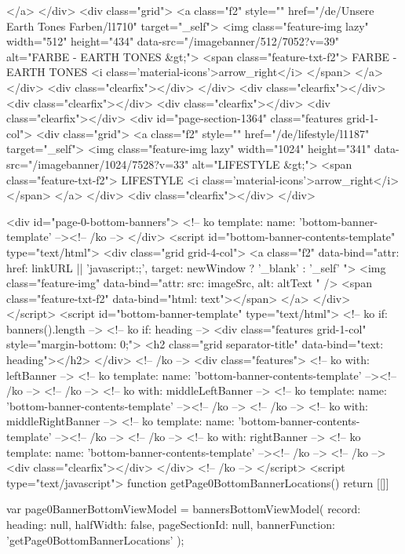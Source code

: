 {{</a>
</div>
<div class="grid">
<a class="f2" style="" href="/de/Unsere Earth Tones Farben/l1710" target="_self">
<img class="feature-img lazy" width="512" height="434" data-src="/imagebanner/512/7052?v=39" alt="FARBE - EARTH TONES &gt;">
<span class="feature-txt-f2">
FARBE - EARTH TONES <i class='material-icons'>arrow_right</i>
</span>
</a>
</div>
<div class="clearfix"></div>
</div>
<div class="clearfix"></div>
<div class="clearfix"></div>
<div class="clearfix"></div>
<div class="clearfix"></div>
<div id="page-section-1364" class="features grid-1-col">
<div class="grid">
<a class="f2" style="" href="/de/lifestyle/l1187" target="_self">
<img class="feature-img lazy" width="1024" height="341" data-src="/imagebanner/1024/7528?v=33" alt="LIFESTYLE &gt;">
<span class="feature-txt-f2">
LIFESTYLE <i class='material-icons'>arrow_right</i>
</span>
</a>
</div>
<div class="clearfix"></div>
</div>


<div id="page-0-bottom-banners">
<!-- ko template: { name: 'bottom-banner-template' } --><!-- /ko -->
</div>
<script id="bottom-banner-contents-template" type="text/html">
    <div class="grid grid-4-col">
        <a class="f2" data-bind="attr: { href: linkURL || 'javascript:;', target: newWindow ? '_blank' : '_self' }">
            <img class="feature-img" data-bind="attr: { src: imageSrc, alt: altText }" />
            <span class="feature-txt-f2" data-bind="html: text"></span>
        </a>
    </div>
</script>
<script id="bottom-banner-template" type="text/html">
    <!-- ko if: banners().length -->
    <!-- ko if: heading -->
    <div class="features grid-1-col" style="margin-bottom: 0;">
        <h2 class="grid separator-title" data-bind="text: heading"></h2>
    </div>
    <!-- /ko -->
    <div class="features">
        <!-- ko with: leftBanner -->
        <!-- ko template: { name: 'bottom-banner-contents-template' } --><!-- /ko -->
        <!-- /ko -->
        <!-- ko with: middleLeftBanner -->
        <!-- ko template: { name: 'bottom-banner-contents-template' } --><!-- /ko -->
        <!-- /ko -->
        <!-- ko with: middleRightBanner -->
        <!-- ko template: { name: 'bottom-banner-contents-template' } --><!-- /ko -->
        <!-- /ko -->
        <!-- ko with: rightBanner -->
        <!-- ko template: { name: 'bottom-banner-contents-template' } --><!-- /ko -->
        <!-- /ko -->
        <div class="clearfix"></div>
    </div>
    <!-- /ko -->
</script>
<script type="text/javascript">
    function getPage0BottomBannerLocations() {
        return [[]]
    }

    var page0BannerBottomViewModel = bannersBottomViewModel({
        record: {
            heading: null,
            halfWidth: false,
            pageSectionId: null,
            bannerFunction: 'getPage0BottomBannerLocations'
        }
    });

}}

